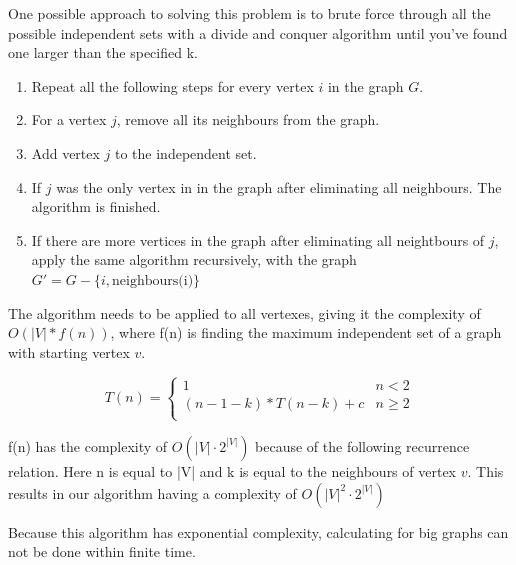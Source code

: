 \documentclass[a4paper,12px]{article}
\begin{document}
One possible approach to solving this problem is to brute force through all the
possible independent sets with a divide and conquer algorithm until you've found
one larger than the specified k.

\begin{enumerate}
    \item{Repeat all the following steps for every vertex $i$ in the graph $G$.}
    \item{For a vertex $j$, remove all its neighbours from the graph.}
    \item{Add vertex $j$ to the independent set.}
    \item{If $j$ was the only vertex in in the graph after eliminating all neighbours.
            The algorithm is finished.}
    \item{If there are more vertices in the graph after eliminating all
        neightbours of $j$, apply the same algorithm recursively, with the graph $G' =
    G - \{ i, \text{neighbours(i)} \}$ }
\end{enumerate}

The algorithm needs to be applied to all vertexes, giving it the complexity of
$O(|V| * f(n))$, where f(n) is finding the maximum independent set of a graph
with starting vertex $v$.

$$T(n) =
    \left\{
        \begin{array}{ll}
            1 & n < 2  \\
            (n - 1 - k) * T(n-k) + c &  n \geq 2 \\
        \end{array}
    \right.$$

f(n) has the complexity of $O(|V| \cdot 2^{|V|})$ because of the following
recurrence relation. Here n is equal to |V| and k is equal to the neighbours of
vertex $v$. This results in our algorithm having a complexity of $O(|V|^{2}
\cdot 2^{|V|})$

Because this algorithm has exponential complexity, calculating for big graphs
can not be done within finite time.

%


%
%
\end{document}
